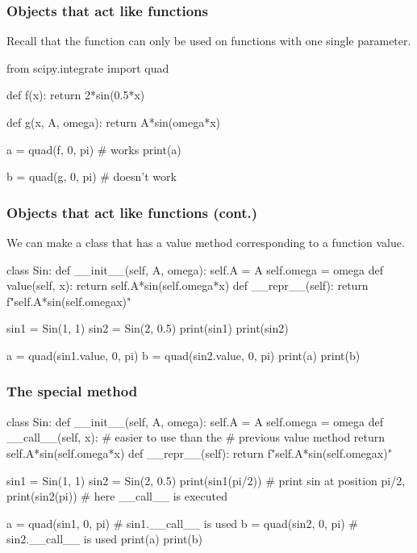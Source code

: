 \documentclass[hyperref={pdfpagelabels=false},table]{beamer}
\begin{document}
\begin{frame}[fragile]\frametitle{Objects that act like functions}

Recall that the  function can only be used on functions with one single parameter. 

\begin{python}
from scipy.integrate import quad

def f(x):
    return 2*sin(0.5*x)

def g(x, A, omega):
    return A*sin(omega*x)

a = quad(f, 0, pi) # works
print(a)

b = quad(g, 0, pi) # doesn't work
\end{python}

\end{frame}

\begin{frame}[fragile]\frametitle{Objects that act like functions (cont.)}

We can make a class that has a value method corresponding to a function value.  

\begin{python}
class Sin:
    def __init__(self, A, omega):
        self.A = A
        self.omega = omega
    def value(self, x):
        return self.A*sin(self.omega*x)
    def __repr__(self):
        return f"{self.A}*sin({self.omega}x)"

sin1 = Sin(1, 1)
sin2 = Sin(2, 0.5)
print(sin1)
print(sin2)

a = quad(sin1.value, 0, pi)
b = quad(sin2.value, 0, pi)
print(a)
print(b)
\end{python}

\end{frame}

\begin{frame}[fragile]\frametitle{The special method }

\begin{python}
class Sin:
    def __init__(self, A, omega):
        self.A = A
        self.omega = omega
    def __call__(self, x): # easier to use than the
                           # previous value method 
        return self.A*sin(self.omega*x)
    def __repr__(self):
        return f"{self.A}*sin({self.omega}x)"

sin1 = Sin(1, 1)
sin2 = Sin(2, 0.5)
print(sin1(pi/2))  # print sin at position pi/2, 
print(sin2(pi))    # here __call__ is executed

a = quad(sin1, 0, pi) # sin1.__call__ is used
b = quad(sin2, 0, pi) # sin2.__call__ is used
print(a)
print(b)
\end{python}  
\end{frame}
\end{document}
